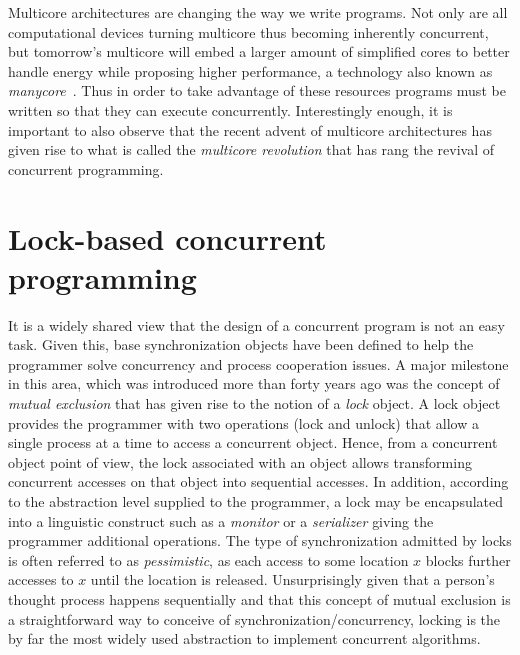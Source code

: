 







Multicore architectures are changing the way we write programs.
Not only are all computational devices
turning multicore thus becoming inherently concurrent, 
but tomorrow's multicore will embed a larger amount of simplified cores to better handle energy while 
proposing higher performance, a technology also known as \emph{manycore}~\cite{Borkar2007}.
Thus in order to take advantage of these resources programs must be written so
that they can execute concurrently.
Interestingly  enough,  
it is important to also observe that the recent advent of multicore 
architectures has  given rise to what is called the {\it multicore  
revolution} \cite{HL08} that has  rang the revival of concurrent programming. 


\section{Lock-based concurrent programming}\label{sec:intro-lockbased}
%
It is a widely shared view  that the design of a concurrent program is not an easy
task.
Given this, base synchronization objects have been defined to help 
the programmer solve  concurrency and process cooperation  issues. 
A  major milestone in this area, which was introduced 
more than forty years  ago was the concept of {\it mutual exclusion} \cite{D68}
that has given rise  to  the  notion of  a  {\it  lock} object.    
A lock object provides the programmer with two operations (lock and unlock)
that  allow a single process at a time to access a concurrent object. 
Hence, from a  concurrent object point of view,   the  lock associated with
an object allows transforming  concurrent  accesses on  that object  
into sequential accesses.
In addition, according to the abstraction level
supplied to the programmer,  a lock may be encapsulated into a linguistic 
construct such as a {\it monitor} \cite{H74} or a {\it serializer} \cite{HA79}
giving the programmer additional operations.
The type of synchronization admitted by locks is often referred to as \emph{pessimistic}, 
as each access to some location $x$ blocks further accesses to $x$ until the location is released.
Unsurprisingly given that
a person's thought process happens sequentially
and that this concept of mutual exclusion is a straightforward way to
conceive of synchronization/concurrency,
locking is the by far the most widely used abstraction to
implement concurrent algorithms.

